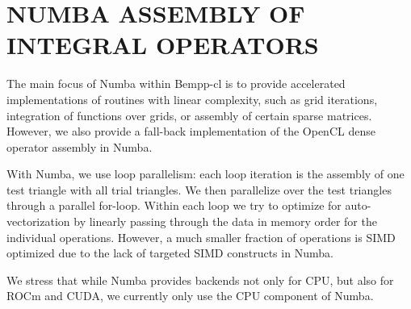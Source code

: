 \section{NUMBA ASSEMBLY OF INTEGRAL OPERATORS}
The main focus of Numba \cite{numba} within Bempp-cl is to provide accelerated implementations of routines with linear complexity, such as grid iterations, integration of functions over grids, or assembly of certain sparse matrices. However, we also provide a fall-back implementation of the OpenCL dense operator assembly in Numba.

With Numba, we use loop parallelism: each loop iteration is the assembly of one test triangle with all trial triangles. We then parallelize over the test triangles through a parallel for-loop.
Within each loop we try to optimize for auto-vectorization by linearly passing through the data in memory order for the individual operations. However, a much smaller fraction of operations is SIMD optimized due to the lack of targeted SIMD constructs in Numba.

We stress that while Numba provides backends not only for CPU, but also for ROCm and CUDA, we currently only use the CPU component of Numba.
